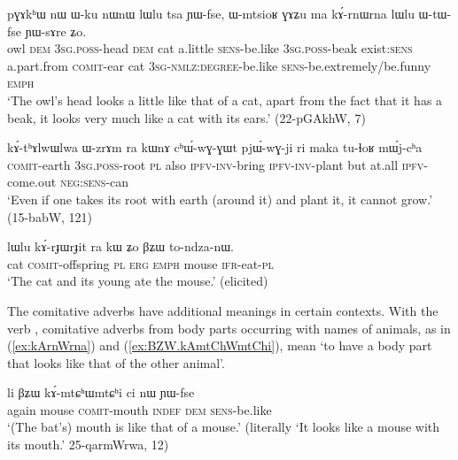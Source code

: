 \begin{exe}
\ex \label{ex:kArnWrna}
\gll pɣɤkʰɯ 	nɯ 	ɯ-ku 	nɯnɯ 	lɯlu 	tsa 	ɲɯ-fse, 	ɯ-mtsioʁ 	ɣɤʑu 	ma kɤ́-rnɯ\redp{}rna 	lɯlu 	ɯ-tɯ-fse 	ɲɯ-sɤre 	ʑo. \\
owl \textsc{dem} \textsc{3sg.poss}-head \textsc{dem} cat a.little \textsc{sens}-be.like \textsc{3sg.poss}-beak exist:\textsc{sens} a.part.from \textsc{comit}-ear cat \textsc{3sg-nmlz:degree}-be.like \textsc{sens}-be.extremely/be.funny \textsc{emph} \\
\glt `The owl's head looks a little like that of a cat, apart from the fact that it has a beak, it looks very much like a cat with its ears.' (22-pGAkhW, 7)
\end{exe}


\begin{exe}
\ex \label{ex:kAthAlwWlwa}
\gll kɤ́-tʰɤlwɯ\tld{}lwa 	ɯ-zrɤm 	ra 	kɯnɤ 	cʰɯ́-wɣ-ɣɯt 	pjɯ́-wɣ-ji 	ri 	maka 	tu-ɬoʁ 	mɯ́j-cʰa \\  
\textsc{comit}-earth \textsc{3sg.poss}-root \textsc{pl} also \textsc{ipfv-inv}-bring \textsc{ipfv-inv}-plant but at.all \textsc{ipfv}-come.out \textsc{neg:sens}-can \\
\glt `Even if one takes its root with earth (around it) and plant it, it cannot grow.' (15-babW, 121)
\end{exe}


\begin{exe}
\ex \label{ex:kArJWrJit.kW}
\gll lɯlu	kɤ́-rɟɯ\tld{}rɟit	ra	kɯ	ʑo	βʑɯ	 to-ndza-nɯ. \\
cat \textsc{comit}-offspring \textsc{pl}  \textsc{erg} \textsc{emph} mouse \textsc{ifr}-eat-\textsc{pl} \\
\glt `The cat and its young ate the mouse.' (elicited)
\end{exe}

The comitative adverbs have additional meanings in certain contexts. With the verb ,  comitative adverbs from body parts occurring with names of animals, as in (\ref{ex:kArnWrna}) and (\ref{ex:BZW.kAmtChWmtChi}), mean `to have a body part that looks like that of the other animal'.

\begin{exe}
\ex \label{ex:BZW.kAmtChWmtChi}
\gll
li βʑɯ kɤ́-mtɕʰɯ\redp{}mtɕʰi ci nɯ ɲɯ-fse  \\
again mouse \textsc{comit}-mouth \textsc{indef} \textsc{dem} \textsc{sens}-be.like \\
\glt `(The bat's) mouth is like that of a mouse.' (literally `It looks like a mouse with its mouth.' 25-qarmWrwa, 12)
\end{exe}

